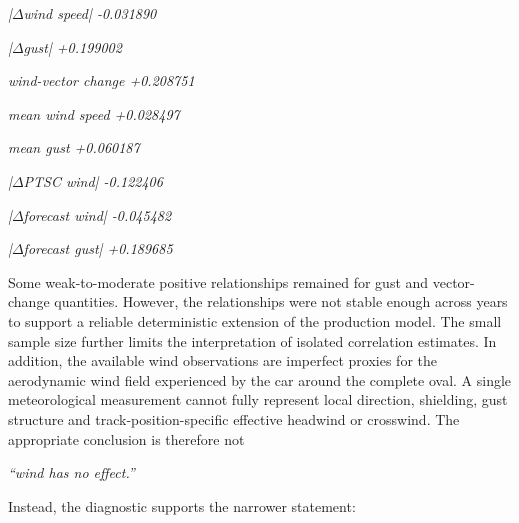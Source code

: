 \begin{center}\textit{|\ensuremath{\Delta}wind speed|           -0.031890}\end{center}

\begin{center}\textit{|\ensuremath{\Delta}gust|                 +0.199002}\end{center}

\begin{center}\textit{wind-vector change      +0.208751}\end{center}

\begin{center}\textit{mean wind speed         +0.028497}\end{center}

\begin{center}\textit{mean gust               +0.060187}\end{center}

\begin{center}\textit{|\ensuremath{\Delta}PTSC wind|            -0.122406}\end{center}

\begin{center}\textit{|\ensuremath{\Delta}forecast wind|        -0.045482}\end{center}

\begin{center}\textit{|\ensuremath{\Delta}forecast gust|        +0.189685}\end{center}

Some weak-to-moderate positive relationships remained for gust and vector-change quantities. However, the relationships were not stable enough across years to support a reliable deterministic extension of the production model. The small sample size further limits the interpretation of isolated correlation estimates. In addition, the available wind observations are imperfect proxies for the aerodynamic wind field experienced by the car around the complete oval. A single meteorological measurement cannot fully represent local direction, shielding, gust structure and track-position-specific effective headwind or crosswind. The appropriate conclusion is therefore not

\begin{center}\textit{``wind has no effect.''}\end{center}

Instead, the diagnostic supports the narrower statement:


